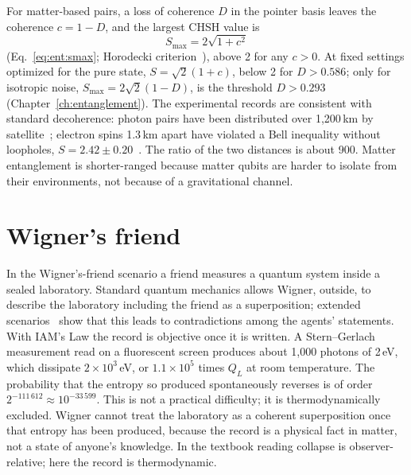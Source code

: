 For matter-based pairs, a loss of coherence $D$ in the pointer basis leaves the coherence $c=1-D$, and the largest CHSH value is
\begin{equation}
S_{\max}=2\sqrt{1+c^2}\label{eq:mp_smax}
\end{equation}
(Eq.~\ref{eq:ent:smax}; Horodecki criterion~\cite{Horodecki1995}), above 2 for any $c>0$. \derived{} At fixed settings optimized for the pure state,
$S=\sqrt2(1+c)$, below 2 for $D>0.586$; only for isotropic noise, $S_{\max}=2\sqrt2(1-D)$, is the threshold $D>0.293$
(Chapter~\ref{ch:entanglement}). \calc{} The experimental records are consistent with standard decoherence: photon pairs have been distributed over
1,200\,km by satellite~\cite{Yin2017}; electron spins 1.3\,km apart have violated a Bell inequality without loopholes, $S=2.42\pm0.20$~\cite{Hensen2015}.
\observed{} The ratio of the two distances is about 900. Matter entanglement is shorter-ranged because matter qubits are harder to isolate from their
environments, not because of a gravitational channel.

\section{Wigner's friend}\label{sec:mp_wigner}
In the Wigner's-friend scenario a friend measures a quantum system inside a sealed laboratory. Standard quantum mechanics allows Wigner, outside, to
describe the laboratory including the friend as a superposition; extended scenarios~\cite{FrauchigerRenner2018} show that this leads to contradictions
among the agents' statements. With IAM's Law the record is objective once it is written. A Stern--Gerlach measurement read on a fluorescent screen
produces about 1,000 photons of 2\,eV, which dissipate $2\times10^3$\,eV, or $1.1\times10^5$ times $Q_L$ at room temperature. \calc{} The probability
that the entropy so produced spontaneously reverses is of order $2^{-111\,612}\approx10^{-33\,599}$. \calc{} This is not a practical difficulty; it is
thermodynamically excluded. Wigner cannot treat the laboratory as a coherent superposition once that entropy has been produced, because the record is a
physical fact in matter, not a state of anyone's knowledge. In the textbook reading collapse is observer-relative; here the record is thermodynamic.
\interp

